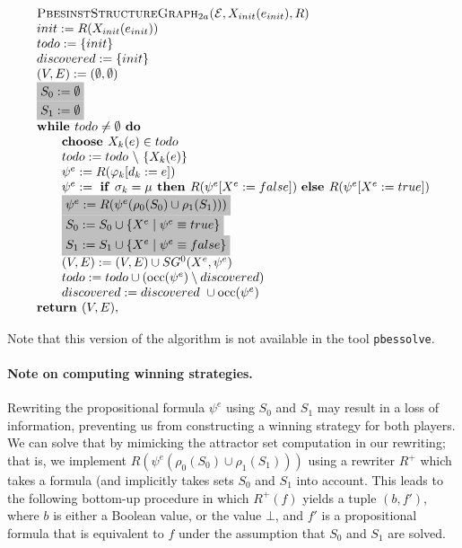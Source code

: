 \documentclass{article}
\newcommand{\Space}{\text{\ }}
\newcommand{\If}{\text{\textbf{if }}}
\newcommand{\Do}{\text{\textbf{ do }}}
\newcommand{\Then}{\text{\textbf{ then }}}
\newcommand{\Else}{\text{\textbf{else }}}
\newcommand{\While}{\text{\textbf{while }}}
\newcommand{\Choose}{\text{\textbf{choose }}}
\newcommand{\Return}{\text{\textbf{return }}}
\begin{document}
\begin{equation*}
\begin{array}{l}
\textsc{PbesinstStructureGraph$_{2a}$(}\mathcal{E}, X_{init}(e_{init}), R) \\ 
init:=R(X_{init}(e_{init})) \\
todo:=\{init\} \\
discovered:=\{init\} \\
(V,E) :=(\emptyset ,\emptyset ) \\ 
\colorbox{lightgray}{$%
S_0:= \emptyset $}\\
\colorbox{lightgray}{$%
S_1:= \emptyset $}\\
\While todo\neq \emptyset \Do \\ 
\qquad \Choose X_{k}(e)\in todo \\ 
\qquad todo:=todo\ \backslash \ \{X_{k}(e)\} \\ 
\qquad \psi ^{e}:=R(\varphi _{k}[d_{k}:=e]) \\ 
\qquad \psi^e := \Space \If \sigma_k = \mu \Then R(\psi^e[X^e := false])
\Space \Else R(\psi^e[X^e := true]) \\
\qquad \colorbox{lightgray}{$%
\psi^{e} := R(\psi^e (\rho_0(S_0) \cup \rho_1(S_1) ) ) $}\\
\qquad \colorbox{lightgray}{$%
S_0 := S_0 \cup \{ X^e \mid \psi^e \equiv true \} $}\\
\qquad \colorbox{lightgray}{$%
S_1 := S_1 \cup \{ X^e \mid \psi^e \equiv false \} $}\\
\qquad (V,E) := (V,E) \cup SG^{0}(X^{e},\psi ^{e}) \\ 
\qquad todo:=todo\cup (\mathrm{occ}(\psi ^{e})\setminus discovered) \\
\qquad discovered:=discovered\ \cup \mathrm{occ}(\psi ^{e}) \\
\Return (V, E),%
\end{array}%
\end{equation*}%

Note that this version of the algorithm is not available in the tool \texttt{pbessolve}.

\paragraph{Note on computing winning strategies.} Rewriting the propositional formula
$\psi^e$ using $S_0$ and $S_1$ may result in a loss of information, preventing us from
constructing a winning strategy for both players. We can solve that by mimicking the
attractor set computation in our rewriting; that is, we implement $R(\psi^e(\rho_0(S_0) \cup \rho_1(S_1)))$
using a rewriter $R^+$ which takes a formula (and implicitly takes sets $S_0$ and $S_1$ into account. 
This leads to the following bottom-up
procedure in which $R^+(f)$ yields a tuple $(b, f')$, where $b$ is either a Boolean value,
or the value $\bot$, and $f'$ is a propositional formula that is equivalent to $f$ under
the assumption that $S_0$ and $S_1$ are solved.
\end{document}
